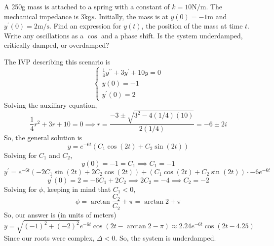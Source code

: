 \begin{example}
	A 250g mass is attached to a spring with a constant of $k = 10\text{N/m}$. The mechanical impedance is 3$\text{kg}{s}$. Initially, the mass is at $y(0)=-1\text{m}$ and $y^\prime(0)=2\text{m/s}$. Find an expression for $y(t)$, the position of the mass at time $t$. Write any oscillations as a $\cos$ and a phase shift. Is the system underdamped, critically damped, or overdamped?
\end{example}
The IVP describing this scenario is
\begin{equation*}
	\begin{cases}
		\frac{1}{4}y^{\prime\prime} + 3y^\prime + 10y = 0 \\
		y(0) = -1 \\
		y^\prime(0) = 2
	\end{cases}
\end{equation*}
Solving the auxiliary equation,
\begin{equation*}
	\frac{1}{4}r^2 + 3r + 10 = 0 \implies r = \frac{-3 \pm \sqrt{3^2 - 4(1/4)(10)}}{2(1/4)} = -6 \pm 2i
\end{equation*}
So, the general solution is
\begin{equation*}
	y = e^{-6t}\left(C_1\cos{(2t)} + C_2\sin{(2t)}\right)
\end{equation*}
Solving for $C_1$ and $C_2$,
\begin{equation*}
	y(0) = -1 = C_1 \implies C_1 = -1
\end{equation*}
\begin{equation*}
	y^\prime = e^{-6t}\left(-2C_1\sin{(2t)} + 2C_2\cos{(2t)}\right) + \left(C_1\cos{(2t)} + C_2\sin{(2t)}\right) \cdot -6e^{-6t}
\end{equation*}
\begin{equation*}
	y^\prime(0) = 2 = -6C_1 + 2C_2 \implies 2C_2 = -4 \implies C_2 = -2
\end{equation*}
Solving for $\phi$, keeping in mind that $C_1 < 0$,
\begin{equation*}
	\phi = \arctan{\frac{C_2}{C_2}} + \pi = \arctan{2} + \pi
\end{equation*}
So, our answer is (in units of meters)
\begin{equation*}
	y = \sqrt{(-1)^2 + (-2)^2}e^{-6t}\cos{\left(2t - \arctan{2} - \pi\right)} \approx 2.24e^{-6t}\cos{\left(2t - 4.25\right)}
\end{equation*}
Since our roots were complex, $\Delta < 0$. So, the system is underdamped.